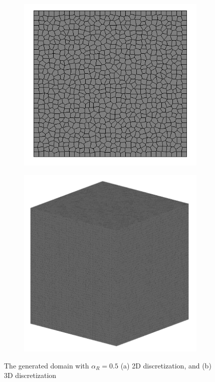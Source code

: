 \begin{figure}[!ht]
\begin{subfigure}[c]{0.48\textwidth}
\includegraphics[width=1\textwidth]{figures/Amir_LEM_Domain_2D.png}
\subcaption{}
\label{fig:Amir_LEM_Domain_2D}
\end{subfigure}
\hfill
\begin{subfigure}[c]{0.48\textwidth}
\includegraphics[width=1\textwidth]{figures/Amir_LEM_Domain_3D.png}
\subcaption{}
\label{fig:Amir_LEM_Domain_3D}
\end{subfigure}
\caption{The generated domain with $\alpha_{R} = 0.5$ (a) 2D discretization, and (b) 3D discretization}
\end{figure}

